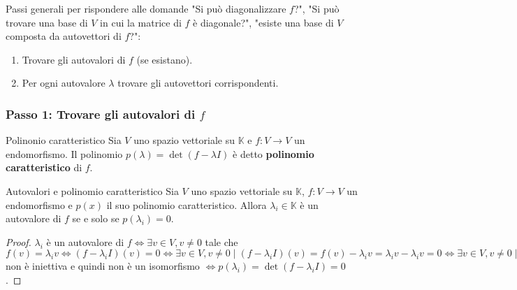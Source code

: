 \documentclass[a4paper]{article}
\theoremstyle{definition}
\begin{document}
	Passi generali per rispondere alle domande "Si può diagonalizzare $f$?",
	"Si può trovare una base di $V$ in cui la matrice di $f$ è diagonale?",
	"esiste una base di $V$ composta da autovettori di $f$?":
	\begin{enumerate}
		\item Trovare gli autovalori di $f$ (se esistano).
		\item Per ogni autovalore $\lambda$ trovare gli autovettori corrispondenti.
	\end{enumerate}

	\subsubsection{Passo 1: Trovare gli autovalori di $f$}
	\begin{deff}{Polinonio caratteristico}{}
		Sia $V$ uno spazio vettoriale su $\mathbb{K}$ e $f: V \to V$ un endomorfismo.
		Il polinomio $p(\lambda) = \det(f - \lambda I)$ è detto \textbf{polinomio caratteristico} di $f$.
	\end{deff}
	\begin{teo}{Autovalori e polinomio caratteristico}{}
		Sia $V$ uno spazio vettoriale su $\mathbb{K}$, $f: V \to V$ un endomorfismo e $p(x)$ il suo polinomio caratteristico.
		Allora $\lambda_i \in \mathbb{K}$ è un autovalore di $f$ se e solo se $p(\lambda_i) = 0$.
	\end{teo}
	\begin{proof}
		$\lambda_i$ è un autovalore di $f \Leftrightarrow \exists v \in V, v \ne 0$ tale che $f(v) = \lambda_i v \Leftrightarrow (f - \lambda_i I)(v) = 0
		\Leftrightarrow \exists v \in V, v \ne 0 \mid (f - \lambda_i I)(v) = f(v) - \lambda_i v = \lambda_i v - \lambda_i v = 0
		\Leftrightarrow \exists v \in V, v \ne 0 \mid v \in \ker (f - \lambda_i V)
		\Leftrightarrow \ker (f - \lambda_i I) \ne \{0\} \Leftrightarrow f - \lambda_i I$ non è iniettiva e quindi non è un isomorfismo
		$\Leftrightarrow p(\lambda_i) = \det(f - \lambda_i I) = 0$.
	\end{proof}
\end{document}
